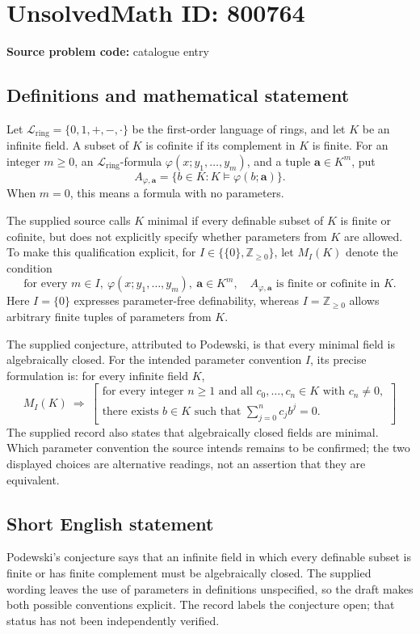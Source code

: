 \documentclass[11pt]{article}
\newcommand{\Z}{\mathbb{Z}}
\begin{document}
\section*{UnsolvedMath ID: 800764}
\textbf{Source problem code:} catalogue entry
\subsection{Definitions and mathematical statement}
Let \(\mathcal L_{\mathrm{ring}}=\{0,1,+,-,\cdot\}\) be the first-order language of rings, and let \(K\) be an infinite field. A subset of \(K\) is cofinite if its complement in \(K\) is finite. For an integer \(m\geq 0\), an \(\mathcal L_{\mathrm{ring}}\)-formula \(\varphi(x;y_1,\ldots,y_m)\), and a tuple \(\mathbf a\in K^m\), put
\[
A_{\varphi,\mathbf a}=\{b\in K:K\models\varphi(b;\mathbf a)\}.
\]
When \(m=0\), this means a formula with no parameters.

The supplied source calls \(K\) minimal if every definable subset of \(K\) is finite or cofinite, but does not explicitly specify whether parameters from \(K\) are allowed. To make this qualification explicit, for \(I\in\bigl\{\{0\},\Z_{\geq 0}\bigr\}\), let \(M_I(K)\) denote the condition
\[
\text{for every }m\in I,\ \varphi(x;y_1,\ldots,y_m),\ \mathbf a\in K^m,
\quad A_{\varphi,\mathbf a}\text{ is finite or cofinite in }K.
\]
Here \(I=\{0\}\) expresses parameter-free definability, whereas \(I=\Z_{\geq0}\) allows arbitrary finite tuples of parameters from \(K\).

The supplied conjecture, attributed to Podewski, is that every minimal field is algebraically closed. For the intended parameter convention \(I\), its precise formulation is: for every infinite field \(K\),
\[
M_I(K)\ \Longrightarrow\ 
\left[
\begin{gathered}
\text{for every integer }n\geq1\text{ and all }c_0,\ldots,c_n\in K
\text{ with }c_n\neq0,\\
\text{there exists }b\in K\text{ such that }
\sum_{j=0}^{n}c_jb^j=0.
\end{gathered}
\right]
\]
The supplied record also states that algebraically closed fields are minimal. Which parameter convention the source intends remains to be confirmed; the two displayed choices are alternative readings, not an assertion that they are equivalent.
\subsection{Short English statement}
Podewski's conjecture says that an infinite field in which every definable subset is finite or has finite complement must be algebraically closed. The supplied wording leaves the use of parameters in definitions unspecified, so the draft makes both possible conventions explicit. The record labels the conjecture open; that status has not been independently verified.
\end{document}
